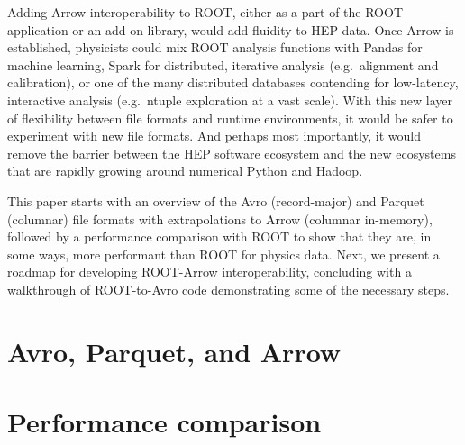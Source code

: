 \documentclass{article}
\begin{document}
Adding Arrow interoperability to ROOT, either as a part of the ROOT application or an add-on library, would add fluidity to HEP data. Once Arrow is established, physicists could mix ROOT analysis functions with Pandas for machine learning, Spark for distributed, iterative analysis (e.g.\ alignment and calibration), or one of the many distributed databases contending for low-latency, interactive analysis (e.g.\ ntuple exploration at a vast scale). With this new layer of flexibility between file formats and runtime environments, it would be safer to experiment with new file formats. And perhaps most importantly, it would remove the barrier between the HEP software ecosystem and the new ecosystems that are rapidly growing around numerical Python and Hadoop.

This paper starts with an overview of the Avro (record-major) and Parquet (columnar) file formats with extrapolations to Arrow (columnar in-memory), followed by a performance comparison with ROOT to show that they are, in some ways, more performant than ROOT for physics data. Next, we present a roadmap for developing ROOT-Arrow interoperability, concluding with a walkthrough of ROOT-to-Avro code demonstrating some of the necessary steps.

\section*{Avro, Parquet, and Arrow}




\pagebreak

\section*{Performance comparison}
\end{document}
